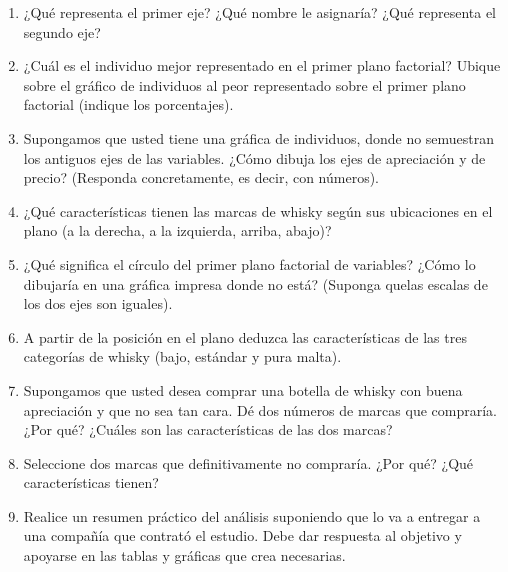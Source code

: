 \documentclass[letterpaper, 12pt]{article}
\begin{document}
\begin{enumerate}
        \item ¿Qué representa el primer eje? ¿Qué nombre le asignaría? ¿Qué 
        representa el segundo eje?
        
        \item ¿Cuál es el individuo mejor representado en el primer plano 
        factorial? Ubique sobre el gráfico de individuos al peor representado 
        sobre el primer plano factorial (indique los porcentajes).
        
        \item Supongamos que usted tiene una gráfica de individuos, donde 
        no semuestran los antiguos ejes de las variables. ¿Cómo dibuja los ejes 
        de apreciación y de precio? (Responda concretamente, es decir, con 
        números).
        
        \item ¿Qué características tienen las marcas de whisky según sus 
        ubicaciones en el plano (a la derecha, a la izquierda, arriba, abajo)?
        
        \item ¿Qué significa el círculo del primer plano factorial de 
        variables? ¿Cómo lo dibujaría en una gráfica impresa donde no está? 
        (Suponga quelas escalas de los dos ejes son iguales).
        
        \item A partir de la posición en el plano deduzca las características 
        de las tres categorías de whisky (bajo, estándar y pura malta).
        
        \item Supongamos que usted desea comprar una botella de whisky con 
        buena apreciación y que no sea tan cara. Dé dos números de marcas que
        compraría. ¿Por qué? ¿Cuáles son las características de las dos marcas?
        
        \item Seleccione dos marcas que definitivamente no compraría. 
        ¿Por qué? ¿Qué características tienen?
        
        \item Realice un resumen práctico del análisis suponiendo que lo va
        a entregar a una compañía que contrató el estudio. Debe dar respuesta al
        objetivo y apoyarse en las tablas y gráficas que crea necesarias.
        

\end{enumerate}
\end{document}
